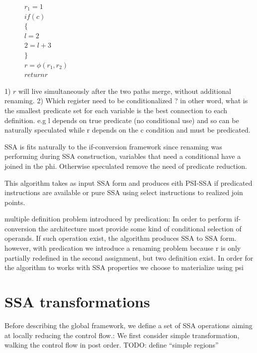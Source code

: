 \begin{figure}
\begin{minipage}[t]{4cm}
$r_1 = 1 $ \\
$ if (c) $ \\
$ \{ $ \\
\hspace*{2mm} $ l = 2 $ \\
\hspace*{2mm} $ 2 = l+3 $ \\
$ \} $ \\
$ r=\phi(r_1,r_2) $ \\
$ return r $ 
\end{minipage}
\end{figure}

1) $r$ will live simultaneously after the two paths merge, without additional renaming.
2) Which register need to be conditionalized ? in other word, what is the smallest predicate set for each variable is the best connection to each definition. e.g l depends on true predicate (no conditional use) and so can be naturally speculated while r depends on the c condition and must be predicated.

SSA is fits naturally to the if-conversion framework since renaming was performing during SSA construction, variables that need a conditional have a joined in the phi. Otherwise speculated remove the need of predicate reduction.

This algorithm takes as input SSA form and produces eith PSI-SSA if predicated instructions are available or pure SSA using select instructions to realized join points.

multiple definition problem introduced by predication: In order to perform if-conversion the architecture most provide some kind of conditional selection of operands. If such operation exist, the algorithm produces SSA to SSA form.
however, with predication we introduce a renaming problem because r is only partially redefined in the second assignment, but two definition exist. In order for the algorithm to works with SSA properties we choose to materialize using psi

\section{SSA transformations}

Before describing the global framework, we define a set of SSA operations aiming at locally reducing the control flow.:
We first consider simple transformation, walking the control flow in post order.
TODO: define ``simple regions''

